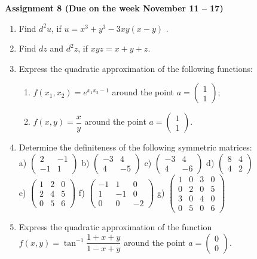 \documentclass{article}
\begin{document}
\fontsize{14}{21}
\selectfont
\centerline{\textbf{Assignment 8 (Due on the week November 11 -- 17)}}
\fontsize{12}{18}
\selectfont

\begin{enumerate}
\item Find $d^2u$, if $u=x^3+y^3-3xy(x-y)$ .
\item Find $dz$ and $d^2z$, if $xyz=x+y+z$.
\item Express the quadratic approximation of the following functions:
\begin{enumerate}
\item $f(x_1, x_2)=e^{x_1x_2-1}$ around the point $a=\begin{pmatrix}1\\1\end{pmatrix}$;
\item $f(x,y)=\dfrac xy$ around the point $a=\begin{pmatrix}1\\1\end{pmatrix}$.
\end{enumerate}
\item Determine the definiteness of the following symmetric matrices:\\
a) $\begin{pmatrix}2 &-1\\-1 &1\end{pmatrix}$ b) $\begin{pmatrix}-3 &4\\4 & -5\end{pmatrix}$ c) $\begin{pmatrix}-3& 4\\4 & -6\end{pmatrix}$ d) $\begin{pmatrix}8 &4\\4 &2\end{pmatrix}$\\
e) $\begin{pmatrix}1 &2 & 0\\2 &4 & 5\\ 0 & 5 & 6\end{pmatrix}$ f) $\begin{pmatrix}-1 & 1 & 0\\1 & -1 & 0\\ 0 & 0 & -2\end{pmatrix}$ g) $\begin{pmatrix}1 & 0 & 3 &0\\0 & 2 & 0 & 5\\ 3 & 0 & 4 & 0\\ 0 & 5 & 0 & 6\end{pmatrix}$
\item Express the quadratic approximation of the function $f(x,y)=\tan^{-1}\dfrac{1+x+y}{1-x+y}$ around the point $a=\begin{pmatrix}0\\0\end{pmatrix}$.

\end{enumerate}
\end{document}
